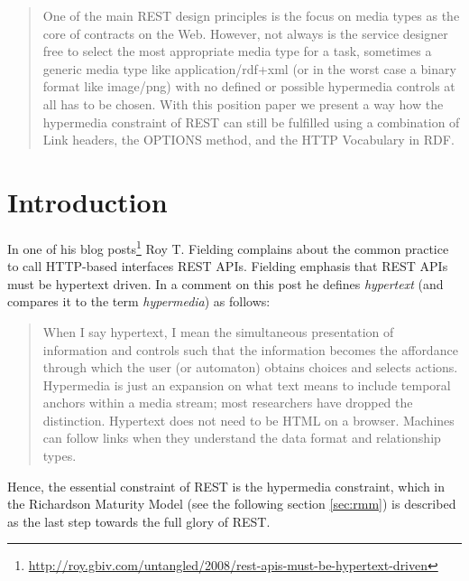\documentclass{acm_proc_article-sp}
\begin{document}
\maketitle
\begin{abstract}
One of the main REST design principles is the focus on media types as the core of contracts on the Web. However, not always is the service designer free to select the most appropriate media type for a task, sometimes a generic media type like application/rdf+xml (or in the worst case a binary format like image/png) with no defined or possible hypermedia controls at all has to be chosen. With this position paper we present a way how the hypermedia constraint of REST can still be fulfilled using a combination of Link headers, the OPTIONS method, and the HTTP Vocabulary in RDF. 
\end{abstract}




\section{Introduction}\label{sec:introduction}
In one of his blog posts\footnote{\url{http://roy.gbiv.com/untangled/2008/rest-apis-must-be-hypertext-driven}} Roy T. Fielding complains about the common practice to call HTTP-based interfaces REST APIs. Fielding emphasis that REST APIs must be hypertext driven. In a comment on this post he defines \textit{hypertext} (and compares it to the term \textit{hypermedia}) as follows:
\begin{quote}
When I say hypertext, I mean the simultaneous presentation of information and controls such that the information becomes the affordance through which the user (or automaton) obtains choices and selects actions. Hypermedia is just an expansion on what text means to include temporal anchors within a media stream; most researchers have dropped the distinction. Hypertext does not need to be HTML on a browser. Machines can follow links when they understand the data format and relationship types.
\end{quote}
Hence, the essential constraint of REST is the hypermedia constraint, which in the Richardson Maturity Model (see the following section \ref{sec:rmm}) is described as the last step towards the full glory of REST.
\end{document}
